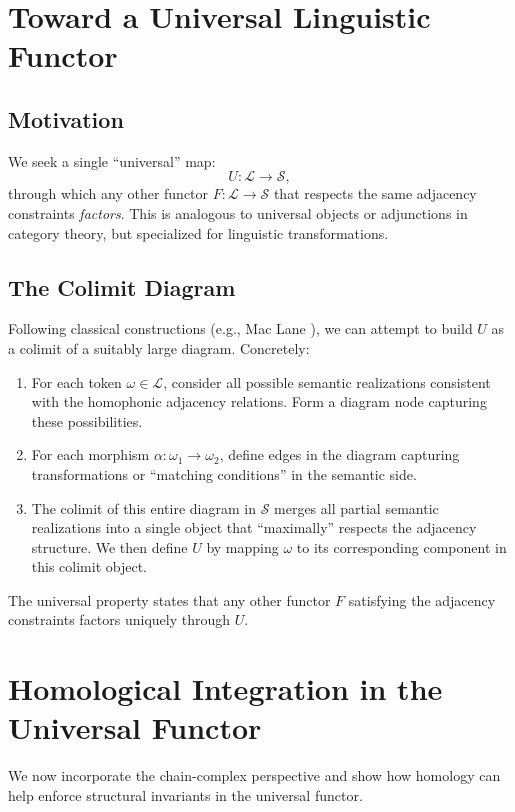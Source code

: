 \documentclass[11pt]{article}
\theoremstyle{definition}
\theoremstyle{remark}
\begin{document}
\section{Toward a Universal Linguistic Functor}
\label{sec:universal-linguistic-functor}

\subsection{Motivation}
We seek a single “universal” map:
\[
U : \mathcal{L} \longrightarrow \mathcal{S},
\]
through which any other functor \(F: \mathcal{L}\to \mathcal{S}\) that respects the same adjacency constraints \emph{factors}. This is analogous to universal objects or adjunctions in category theory, but specialized for linguistic transformations.

\subsection{The Colimit Diagram}
Following classical constructions (e.g., Mac Lane \cite{MacLane1978}), we can attempt to build \(U\) as a colimit of a suitably large diagram. Concretely:
\begin{enumerate}
    \item For each token \(\omega\in\mathcal{L}\), consider all possible semantic realizations consistent with the homophonic adjacency relations. Form a diagram node capturing these possibilities.
    \item For each morphism \(\alpha: \omega_1\to \omega_2\), define edges in the diagram capturing transformations or “matching conditions” in the semantic side.
    \item The colimit of this entire diagram in \(\mathcal{S}\) merges all partial semantic realizations into a single object that “maximally” respects the adjacency structure. We then define \(U\) by mapping \(\omega\) to its corresponding component in this colimit object.
\end{enumerate}

The universal property states that any other functor \(F\) satisfying the adjacency constraints factors uniquely through \(U\). 

\section{Homological Integration in the Universal Functor}
\label{sec:homological-integration}
We now incorporate the chain-complex perspective and show how homology can help enforce structural invariants in the universal functor.
\end{document}
